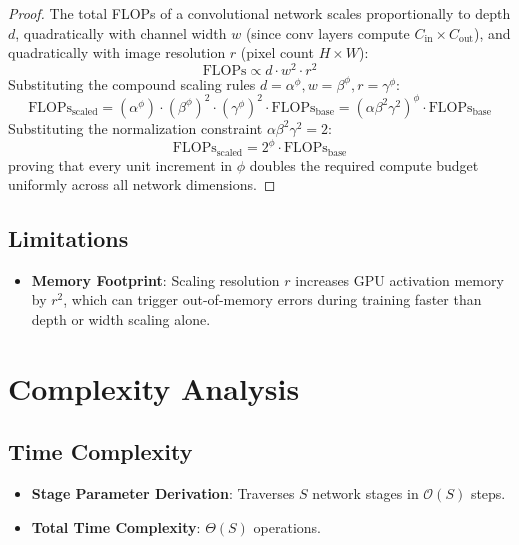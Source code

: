 \documentclass[11pt,a4paper]{article}
\theoremstyle{definition}
\begin{document}
\begin{proof}
The total FLOPs of a convolutional network scales proportionally to depth $d$, quadratically with channel width $w$ (since conv layers compute $C_{\text{in}} \times C_{\text{out}}$), and quadratically with image resolution $r$ (pixel count $H \times W$):
\begin{equation}
\text{FLOPs} \propto d \cdot w^2 \cdot r^2
\end{equation}
Substituting the compound scaling rules $d = \alpha^\phi, w = \beta^\phi, r = \gamma^\phi$:
\begin{equation}
\text{FLOPs}_{\text{scaled}} = (\alpha^\phi) \cdot (\beta^\phi)^2 \cdot (\gamma^\phi)^2 \cdot \text{FLOPs}_{\text{base}} = (\alpha \beta^2 \gamma^2)^\phi \cdot \text{FLOPs}_{\text{base}}
\end{equation}
Substituting the normalization constraint $\alpha \beta^2 \gamma^2 = 2$:
\begin{equation}
\text{FLOPs}_{\text{scaled}} = 2^\phi \cdot \text{FLOPs}_{\text{base}}
\end{equation}
proving that every unit increment in $\phi$ doubles the required compute budget uniformly across all network dimensions.
\end{proof}

\subsection{Limitations}
\begin{itemize}
    \item \textbf{Memory Footprint}: Scaling resolution $r$ increases GPU activation memory by $r^2$, which can trigger out-of-memory errors during training faster than depth or width scaling alone.
\end{itemize}

\section{Complexity Analysis}

\subsection{Time Complexity}
\begin{itemize}
    \item \textbf{Stage Parameter Derivation}: Traverses $S$ network stages in $\mathcal{O}(S)$ steps.
    \item \textbf{Total Time Complexity}: $\Theta(S)$ operations.
\end{itemize}
\end{document}
